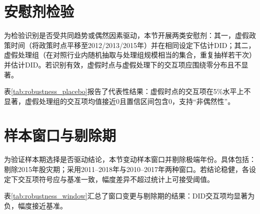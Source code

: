
\section{安慰剂检验}
\label{sec:robustness_placebo}

为检验识别是否受共同趋势或偶然因素驱动，本节开展两类安慰剂：其一，虚假政策时间（将政策时点平移至2012/2013/2015年）并在相同设定下估计DID；其二，虚假处理组（在对照行业内随机抽取与处理组规模相当的集合，重复抽样若干次）并估计DID。若识别有效，虚假时点与虚假处理下的交互项应围绕零分布且不显著。

表\ref{tab:robustness_placebo}报告了代表性结果：虚假时点的交互项在5\%水平上不显著，虚假处理组的交互项均值接近0且置信区间包含0，支持“非偶然性”。




\section{样本窗口与剔除期}
\label{sec:robustness_window}

为验证样本期选择是否驱动结论，本节变动样本窗口并剔除极端年份。具体包括：剔除2015年股灾期；采用2011–2018年与2010–2017年两种窗口。若结论稳健，各设定下交互项符号应与基准一致，幅度差异不超过统计上可接受阈值。

表\ref{tab:robustness_window}汇总了窗口变更与剔除期的结果：DID交互项均显著为负，幅度接近基准。



